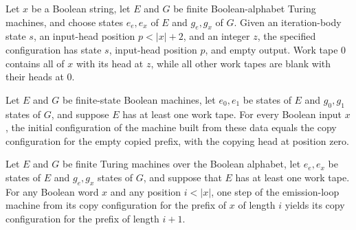 \begin{definition}
\label{Turing.fullCfg}
\leanok
{}
Let $x$ be a Boolean string, let $E$ and $G$ be finite Boolean-alphabet Turing machines,
and choose states $e_e,e_x$ of $E$ and $g_e,g_x$ of $G$. Given an iteration-body state
$s$, an input-head position $p<|x|+2$, and an integer $z$, the specified configuration
has state $s$, input-head position $p$, and empty output. Work tape $0$ contains all of
$x$ with its head at $z$, while all other work tapes are blank with their heads at $0$.
\end{definition}

\begin{theorem}
\label{Turing.initCfg_eq_copyCfg}
\leanok
{}
Let $E$ and $G$ be finite-state Boolean machines, let $e_0,e_1$ be states of $E$ and
$g_0,g_1$ states of $G$, and suppose $E$ has at least one work tape. For every Boolean
input $x$, the initial configuration of the machine built from these data equals the
copy configuration for the empty copied prefix, with the copying head at position zero.
\end{theorem}

\begin{theorem}
\label{Turing.copy_step}
\leanok
{}
Let $E$ and $G$ be finite Turing machines over the Boolean alphabet, let $e_e,e_x$ be
states of $E$ and $g_e,g_x$ states of $G$, and suppose that $E$ has at least one work
tape. For any Boolean word $x$ and any position $i<|x|$, one step of the emission-loop
machine from its copy configuration for the prefix of $x$ of length $i$ yields its copy
configuration for the prefix of length $i+1$.
\end{theorem}

